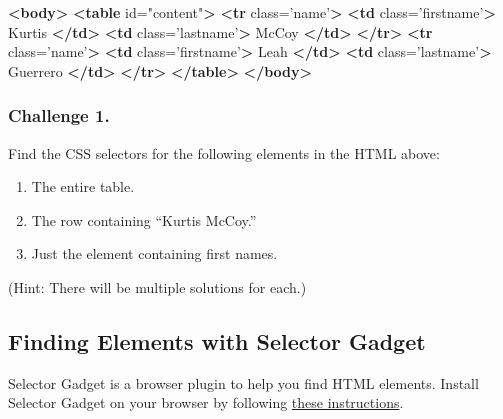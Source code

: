 \documentclass[
]{book}
\newenvironment{Shaded}{\begin{snugshade}}{\end{snugshade}}
\newcommand{\KeywordTok}[1]{\textcolor[rgb]{0.13,0.29,0.53}{\textbf{#1}}}
\newcommand{\NormalTok}[1]{#1}
\newcommand{\OtherTok}[1]{\textcolor[rgb]{0.56,0.35,0.01}{#1}}
\newcommand{\StringTok}[1]{\textcolor[rgb]{0.31,0.60,0.02}{#1}}
\providecommand{\tightlist}{%
  \setlength{\itemsep}{0pt}\setlength{\parskip}{0pt}}
\begin{document}
\begin{Shaded}
\begin{Highlighting}[]
\KeywordTok{<body>}
    \KeywordTok{<table}\OtherTok{ id=}\StringTok{"content"}\KeywordTok{>}
        \KeywordTok{<tr}\OtherTok{ class=}\StringTok{'name'}\KeywordTok{>}
            \KeywordTok{<td}\OtherTok{ class=}\StringTok{'firstname'}\KeywordTok{>}
\NormalTok{                Kurtis}
            \KeywordTok{</td>}
            \KeywordTok{<td}\OtherTok{ class=}\StringTok{'lastname'}\KeywordTok{>}
\NormalTok{                McCoy}
            \KeywordTok{</td>}
        \KeywordTok{</tr>}
        \KeywordTok{<tr}\OtherTok{ class=}\StringTok{'name'}\KeywordTok{>}
            \KeywordTok{<td}\OtherTok{ class=}\StringTok{'firstname'}\KeywordTok{>}
\NormalTok{                Leah}
            \KeywordTok{</td>}
            \KeywordTok{<td}\OtherTok{ class=}\StringTok{'lastname'}\KeywordTok{>}
\NormalTok{                Guerrero}
            \KeywordTok{</td>}
        \KeywordTok{</tr>}
    \KeywordTok{</table>}
\KeywordTok{</body>}
\end{Highlighting}
\end{Shaded}

\hypertarget{challenge-1.-15}{%
\subsubsection*{Challenge 1.}\label{challenge-1.-15}}

Find the CSS selectors for the following elements in the HTML above:

\begin{enumerate}
\def\labelenumi{\arabic{enumi}.}
\tightlist
\item
  The entire table.
\item
  The row containing ``Kurtis McCoy.''
\item
  Just the element containing first names.
\end{enumerate}

(Hint: There will be multiple solutions for each.)

\hypertarget{finding-elements-with-selector-gadget}{%
\subsection{Finding Elements with Selector Gadget}\label{finding-elements-with-selector-gadget}}

Selector Gadget is a browser plugin to help you find HTML elements. Install Selector Gadget on your browser by following \href{https://selectorgadget.com/}{these instructions}.
\end{document}
